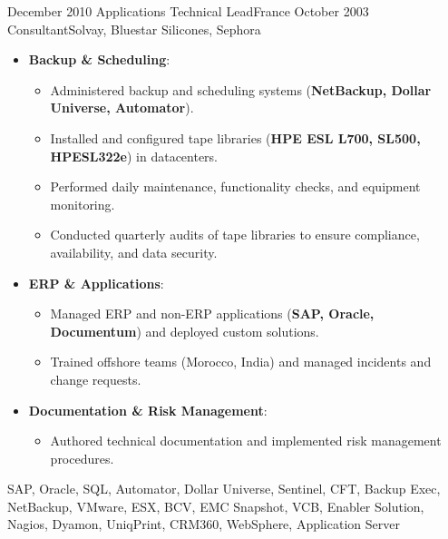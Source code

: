 \begin{experiences}
\emptySeparator

\consultantexperience
    {December 2010} {Applications Technical Lead}{}{France}
    {October 2003}    {Consultant}{Solvay, Bluestar Silicones, Sephora} {
        \begin{itemize}[left=0pt,label={},itemsep=0.5em]

          \item \textbf{Backup \& Scheduling}:
            \begin{itemize}[itemsep=0.2em,topsep=0.2em,parsep=0pt]
              \small
              \item Administered backup and scheduling systems (\textbf{NetBackup, Dollar Universe, Automator}).
              \item Installed and configured tape libraries (\textbf{HPE ESL L700, SL500, HPESL322e}) in datacenters.
              \item Performed daily maintenance, functionality checks, and equipment monitoring.
              \item Conducted quarterly audits of tape libraries to ensure compliance, availability, and data security.
            \end{itemize}

          \item \textbf{ERP \& Applications}:
            \begin{itemize}[itemsep=0.2em,topsep=0.2em,parsep=0pt]
              \small
              \item Managed ERP and non-ERP applications (\textbf{SAP, Oracle, Documentum}) and deployed custom solutions.
              \item Trained offshore teams (Morocco, India) and managed incidents and change requests.
            \end{itemize}

          \item \textbf{Documentation \& Risk Management}:
            \begin{itemize}[itemsep=0.2em,topsep=0.2em,parsep=0pt]
              \small
              \item Authored technical documentation and implemented risk management procedures.
            \end{itemize}

        \end{itemize}
    }
    {SAP, Oracle, SQL, Automator, Dollar Universe, Sentinel, CFT, Backup Exec, NetBackup, VMware, ESX, BCV, EMC Snapshot, VCB, Enabler Solution, Nagios, Dyamon, UniqPrint, CRM360, WebSphere, Application Server}

\emptySeparator
\end{experiences}
